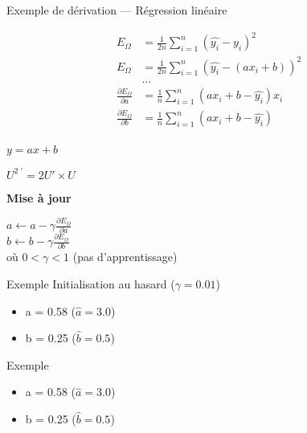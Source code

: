 \begin{frame}{Exemple de dérivation --- Régression linéaire}
  \begin{minipage}[l]{0.49\linewidth}
    \begin{align*}
      E_\Omega & = \frac{1}{2n} \sum_{i=1}^n( \hat{y_i} - y_i )^2 \\
      E_\Omega & = \frac{1}{2n}\sum_{i=1}^n( \hat{y_i} - (ax_i + b) )^2 \\
      & ... \\
      \frac{\partial E_\Omega}{\partial a} & = \frac{1}{n}\sum^n_{i=1}(ax_i + b - \hat{y_i})x_i \\
      \frac{\partial E_\Omega}{\partial b} & = \frac{1}{n}\sum^n_{i=1}(ax_i + b - \hat{y_i}) \\
    \end{align*}
  \end{minipage}\hfill
  \begin{minipage}[c]{0.49\linewidth}
    \begin{center}
      $\boxed{y = ax+b}$
    \end{center}

    \begin{center}
      $\boxed{U^{2\;\prime}=2U' \times U}$
    \end{center}
    \vfill
    \begin{center}
      \textbf{Mise à jour}

      $a \leftarrow a - \gamma\frac{\partial{E_{\Omega}}}{\partial{a}}$ \\
      $b \leftarrow b - \gamma\frac{\partial{E_{\Omega}}}{\partial{b}}$ \\
      $\;$ \\
      où $0 < \gamma < 1$ (pas d'apprentissage)
    \end{center}
  \end{minipage}\hfill
\end{frame}

\begin{frame}{Exemple}
  Initialisation au hasard ($\gamma = 0.01$)
  \begin{itemize}
    \item a = 0.58 ($\hat{a} = 3.0$)
    \item b = 0.25 ($\hat{b} = 0.5$)
  \end{itemize}
\end{frame}

\begin{frame}{Exemple}
  \begin{itemize}
    \item a = 0.58 ($\hat{a} = 3.0$)
    \item b = 0.25 ($\hat{b} = 0.5$)
  \end{itemize}
\end{frame}

